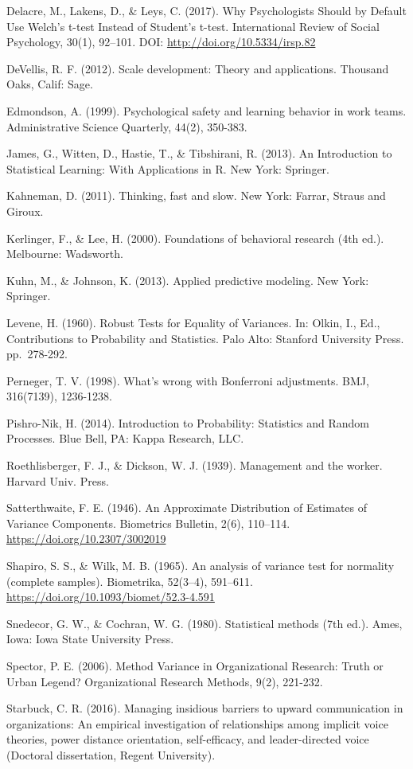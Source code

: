 \documentclass[]{book}
\begin{document}
Delacre, M., Lakens, D., \& Leys, C. (2017). Why Psychologists Should by Default Use Welch's t-test Instead of Student's t-test. International Review of Social Psychology, 30(1), 92--101. DOI: \url{http://doi.org/10.5334/irsp.82}

DeVellis, R. F. (2012). Scale development: Theory and applications. Thousand Oaks, Calif: Sage.

Edmondson, A. (1999). Psychological safety and learning behavior in work teams. Administrative Science Quarterly, 44(2), 350-383.

James, G., Witten, D., Hastie, T., \& Tibshirani, R. (2013). An Introduction to Statistical Learning: With Applications in R. New York: Springer.

Kahneman, D. (2011). Thinking, fast and slow. New York: Farrar, Straus and Giroux.

Kerlinger, F., \& Lee, H. (2000). Foundations of behavioral research (4th ed.). Melbourne: Wadsworth.

Kuhn, M., \& Johnson, K. (2013). Applied predictive modeling. New York: Springer.

Levene, H. (1960). Robust Tests for Equality of Variances. In: Olkin, I., Ed., Contributions to Probability and Statistics. Palo Alto: Stanford University Press. pp.~278-292.

Perneger, T. V. (1998). What's wrong with Bonferroni adjustments. BMJ, 316(7139), 1236-1238.

Pishro-Nik, H. (2014). Introduction to Probability: Statistics and Random Processes. Blue Bell, PA: Kappa Research, LLC.

Roethlisberger, F. J., \& Dickson, W. J. (1939). Management and the worker. Harvard Univ. Press.

Satterthwaite, F. E. (1946). An Approximate Distribution of Estimates of Variance Components. Biometrics Bulletin, 2(6), 110--114. \url{https://doi.org/10.2307/3002019}

Shapiro, S. S., \& Wilk, M. B. (1965). An analysis of variance test for normality (complete samples). Biometrika, 52(3--4), 591--611. \url{https://doi.org/10.1093/biomet/52.3-4.591}

Snedecor, G. W., \& Cochran, W. G. (1980). Statistical methods (7th ed.). Ames, Iowa: Iowa State University Press.

Spector, P. E. (2006). Method Variance in Organizational Research: Truth or Urban Legend? Organizational Research Methods, 9(2), 221-232.

Starbuck, C. R. (2016). Managing insidious barriers to upward communication in organizations: An empirical investigation of relationships among implicit voice theories, power distance orientation, self-efficacy, and leader-directed voice (Doctoral dissertation, Regent University).
\end{document}
